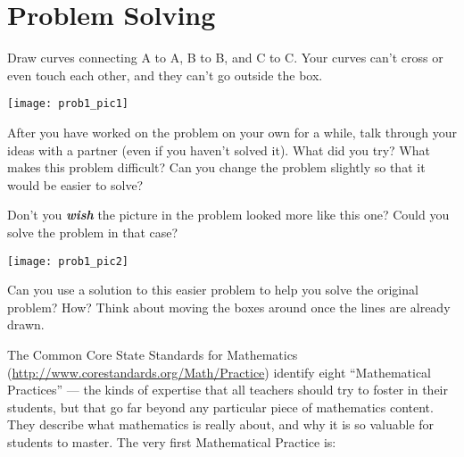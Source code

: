 
\chapter{Problem Solving}


\begin{problem}[ABC]
Draw curves connecting A to A, B to B, and C to C.  Your curves can't cross or even touch each other, and they can't go outside the box.
\begin{center}
\texttt{[image: prob1\_pic1]}
\end{center}
\end{problem}


\begin{thinkpair*}
After you have worked on the problem on your own for a while, talk through your ideas with a partner (even if you haven't solved it).  What did you try?   What makes this problem difficult?  Can you change the problem slightly so that it would be easier to solve?
\end{thinkpair*}

\begin{ps}
Don't you \emph{\bf wish} the picture in the problem looked more like this one?  Could you solve the problem in that case?
\begin{center}
\texttt{[image: prob1\_pic2]}
\end{center}
\end{ps}

Can you use a solution to this easier problem to help you solve the original problem?  How?  Think about moving the boxes around once the lines are already drawn.


The Common Core State Standards for Mathematics (\url{http://www.corestandards.org/Math/Practice}) identify eight ``Mathematical Practices'' --- the kinds of expertise that all teachers should try to foster in their students, but that go far beyond any particular piece of mathematics content.  They describe what mathematics is really about, and why it is so valuable for students to master.  The very first Mathematical Practice is:


